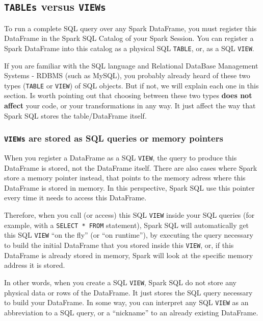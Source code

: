 \documentclass[
  11pt,
  letterpaper,
  DIV=11,
  numbers=noendperiod]{scrreprt}
\begin{document}
\hypertarget{tables-versus-views}{%
\subsection{\texorpdfstring{\texttt{TABLEs} versus
\texttt{VIEWs}}{TABLEs versus VIEWs}}\label{tables-versus-views}}

To run a complete SQL query over any Spark DataFrame, you must register
this DataFrame in the Spark SQL Catalog of your Spark Session. You can
register a Spark DataFrame into this catalog as a physical SQL
\texttt{TABLE}, or, as a SQL \texttt{VIEW}.

If you are familiar with the SQL language and Relational DataBase
Management Systems - RDBMS (such as MySQL), you probably already heard
of these two types (\texttt{TABLE} or \texttt{VIEW}) of SQL objects. But
if not, we will explain each one in this section. Is worth pointing out
that choosing between these two types \textbf{does not affect} your
code, or your transformations in any way. It just affect the way that
Spark SQL stores the table/DataFrame itself.

\hypertarget{views-are-stored-as-sql-queries-or-memory-pointers}{%
\subsubsection{\texorpdfstring{\texttt{VIEWs} are stored as SQL queries
or memory
pointers}{VIEWs are stored as SQL queries or memory pointers}}\label{views-are-stored-as-sql-queries-or-memory-pointers}}

When you register a DataFrame as a SQL \texttt{VIEW}, the query to
produce this DataFrame is stored, not the DataFrame itself. There are
also cases where Spark store a memory pointer instead, that points to
the memory adress where this DataFrame is stored in memory. In this
perspective, Spark SQL use this pointer every time it needs to access
this DataFrame.

Therefore, when you call (or access) this SQL \texttt{VIEW} inside your
SQL queries (for example, with a \texttt{SELECT\ *\ FROM} statement),
Spark SQL will automatically get this SQL \texttt{VIEW} ``on the fly''
(or ``on runtime''), by executing the query necessary to build the
initial DataFrame that you stored inside this \texttt{VIEW}, or, if this
DataFrame is already stored in memory, Spark will look at the specific
memory address it is stored.

In other words, when you create a SQL \texttt{VIEW}, Spark SQL do not
store any physical data or rows of the DataFrame. It just stores the SQL
query necessary to build your DataFrame. In some way, you can interpret
any SQL \texttt{VIEW} as an abbreviation to a SQL query, or a
``nickname'' to an already existing DataFrame.
\end{document}

